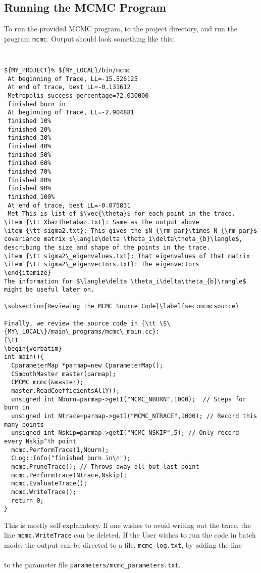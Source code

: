 \documentclass[UserManual.tex]{subfiles}
\begin{document}
\subsection{Running the MCMC Program}
To run the provided MCMC program, to the project directory, and run the program {\tt mcmc}. Output should look something like this:
{\tt
\begin{verbatim}
${MY_PROJECT}% ${MY_LOCAL}/bin/mcmc
 At beginning of Trace, LL=-15.526125
 At end of trace, best LL=-0.131612
 Metropolis success percentage=72.030000
 finished burn in
 At beginning of Trace, LL=-2.904881
 finished 10%
 finished 20%
 finished 30%
 finished 40%
 finished 50%
 finished 60%
 finished 70%
 finished 80%
 finished 90%
 finished 100%
 At end of trace, best LL=-0.075831
 Met This is list of $\vec{\theta}$ for each point in the trace.
\item {\tt XbarThetabar.txt}: Same as the output above
\item {\tt sigma2.txt}: This gives the $N_{\rm par}\times N_{\rm par}$ covariance matrix $\langle\delta \theta_i\delta\theta_{b}\langle$, describing the size and shape of the points in the trace.
\item {\tt sigma2\_eigenvalues.txt}: That eigenvalues of that matrix
\item {\tt sigma2\_eigenvectors.txt}: The eigenvectors
\end{itemize}
The information for $\langle\delta \theta_i\delta\theta_{b}\rangle$ might be useful later on.

\subsection{Reviewing the MCMC Source Code}\label{sec:mcmcsource}

Finally, we review the source code in {\tt \$\{MY\_LOCAL\}/main\_programs/mcmc\_main.cc}:
{\tt
\begin{verbatim}
int main(){
  CparameterMap *parmap=new CparameterMap();
  CSmoothMaster master(parmap);
  CMCMC mcmc(&master);
  master.ReadCoefficientsAllY();
  unsigned int Nburn=parmap->getI("MCMC_NBURN",1000);  // Steps for burn in
  unsigned int Ntrace=parmap->getI("MCMC_NTRACE",1000); // Record this many points
  unsigned int Nskip=parmap->getI("MCMC_NSKIP",5); // Only record every Nskip^th point  
  mcmc.PerformTrace(1,Nburn);  
  CLog::Info("finished burn in\n");
  mcmc.PruneTrace(); // Throws away all but last point
  mcmc.PerformTrace(Ntrace,Nskip);
  mcmc.EvaluateTrace();
  mcmc.WriteTrace();
  return 0;
}
\end{verbatim}}
This is mostly self-explanatory. If one wishes to avoid writing out the trace, the line {\tt mcmc.WriteTrace} can be deleted. If the User wishes to run the code in batch mode, the output can be directed to a file, {\tt mcmc\_log.txt}, by adding the line\\
\hspace*{20pt}{\tt LogFileName mcmc\_log.txt} \\
to the parameter file {\tt parameters/mcmc\_parameters.txt}.
\end{document}

